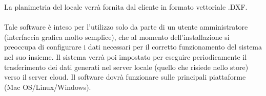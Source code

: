 La planimetria del locale verrà fornita dal cliente in formato vettoriale .DXF. \\ \\
Tale software è inteso per l'utilizzo solo da parte di un utente amministratore (interfaccia grafica molto semplice), che al momento dell'installazione si preoccupa di configurare i dati necessari per il corretto funzionamento del sistema nel suo insieme. Il sistema verrà poi impostato per eseguire periodicamente il trasferimento dei dati generati nel server locale (quello che risiede nello store) verso il server cloud.
Il software dovrà funzionare sulle principali piattaforme (Mac OS/Linux/Windows).















